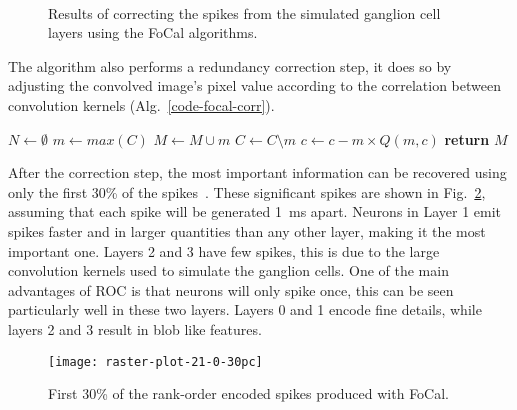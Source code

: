\begin{figure}[hbt]
  \centering
  \\
  \caption{Results of correcting the spikes from the simulated ganglion cell layers using the FoCal algorithms.}
  \label{fig-convolution-results}
\end{figure}
The algorithm also performs a redundancy correction step, it does so by 
adjusting the convolved image's pixel value according to the correlation 
between convolution kernels (Alg.~\ref{code-focal-corr}).
\begin{algorithm}[h]
  \caption{FoCal, Part 2}
  \label{code-focal-corr}
  \begin{algorithmic}
    \State $N \leftarrow \emptyset$ 
    \Repeat
    \State $m \leftarrow max(C)$
    \State $M \leftarrow M \cup m$
    \State $C \leftarrow C \setminus m$
     
     
    \State $c \leftarrow c - m \times Q(m, c)$
    \EndIf
    \EndFor
    \State \textbf{return} $M$
    \EndProcedure
  \end{algorithmic}
\end{algorithm}


After the correction step, the most important information can be recovered using only the first 30\% of the spikes~\citep{sen2009evaluating}. These significant spikes are shown in Fig.~\ref{fig-raster-plot-30pc}, assuming that each spike will be generated 1~ms apart. Neurons in Layer 1 emit spikes faster and in larger quantities than any other layer, making it the most important one. Layers 2 and 3 have few spikes, this is due to the large convolution kernels used to simulate the ganglion cells. One of the main advantages of ROC is that neurons will only spike once, this can be seen particularly well in these two layers. Layers 0 and 1 encode fine details, while layers 2 and 3 result in blob like features.
\begin{figure}[hbt]
  \centering
      \texttt{[image: raster-plot-21-0-30pc]}
      \caption{First 30\% of the rank-order encoded spikes produced with FoCal.}
      \label{fig-raster-plot-30pc}
\end{figure}

